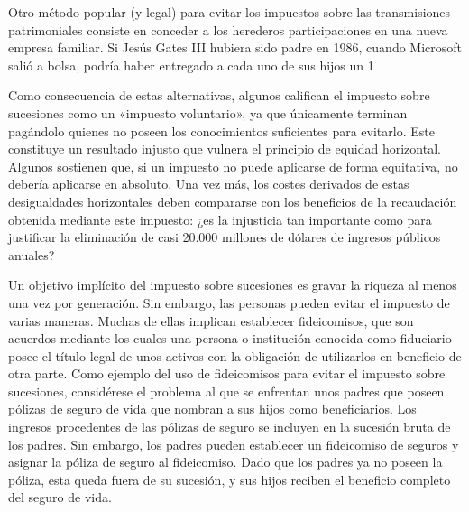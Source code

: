 \documentclass[10pt,a4paper]{article}
\begin{document}
Otro método popular (y legal) para evitar los impuestos sobre las transmisiones patrimoniales consiste en conceder a los herederos participaciones en una nueva empresa familiar. Si Jesús Gates III hubiera sido padre en 1986, cuando Microsoft salió a bolsa, podría haber entregado a cada uno de sus hijos un 1 %

Como consecuencia de estas alternativas, algunos califican el impuesto sobre sucesiones como un «impuesto voluntario», ya que únicamente terminan pagándolo quienes no poseen los conocimientos suficientes para evitarlo. Este constituye un resultado injusto que vulnera el principio de equidad horizontal. Algunos sostienen que, si un impuesto no puede aplicarse de forma equitativa, no debería aplicarse en absoluto. Una vez más, los costes derivados de estas desigualdades horizontales deben compararse con los beneficios de la recaudación obtenida mediante este impuesto: ¿es la injusticia tan importante como para justificar la eliminación de casi 20.000 millones de dólares de ingresos públicos anuales?

Un objetivo implícito del impuesto sobre sucesiones es gravar la riqueza al menos una vez por generación. Sin embargo, las personas pueden evitar el impuesto de varias maneras. Muchas de ellas implican establecer fideicomisos, que son acuerdos mediante los cuales una persona o institución conocida como fiduciario posee el título legal de unos activos con la obligación de utilizarlos en beneficio de otra parte. Como ejemplo del uso de fideicomisos para evitar el impuesto sobre sucesiones, considérese el problema al que se enfrentan unos padres que poseen pólizas de seguro de vida que nombran a sus hijos como beneficiarios. Los ingresos procedentes de las pólizas de seguro se incluyen en la sucesión bruta de los padres. Sin embargo, los padres pueden establecer un fideicomiso de seguros y asignar la póliza de seguro al fideicomiso. Dado que los padres ya no poseen la póliza, esta queda fuera de su sucesión, y sus hijos reciben el beneficio completo del seguro de vida.
\end{document}
